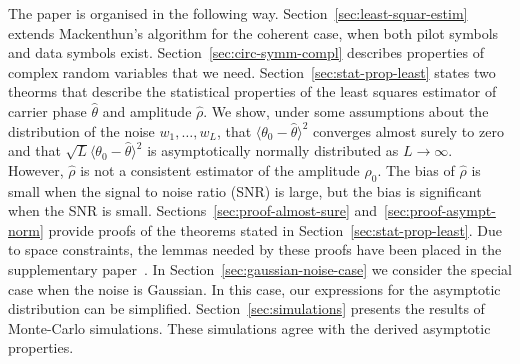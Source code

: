 \documentclass[journal]{IEEEtran}
\begin{document}
The paper is organised in the following way.  Section~\ref{sec:least-squar-estim} extends Mackenthun's algorithm for the coherent case, when both pilot symbols and data symbols exist.  Section~\ref{sec:circ-symm-compl} describes properties of complex random variables that we need.  Section~\ref{sec:stat-prop-least} states two theorms that describe the statistical properties of the least squares estimator of carrier phase $\hat{\theta}$ and amplitude $\hat{\rho}$.  We show, under some assumptions about the distribution of the noise $w_1,\dots,w_L$, that $\langle\theta_0 - \hat{\theta}\rangle^2$ converges almost surely to zero and that $\sqrt{L}\langle\theta_0 - \hat{\theta}\rangle^2$ is asymptotically normally distributed as $L\rightarrow \infty$.  However, $\hat{\rho}$ is not a consistent estimator of the amplitude $\rho_0$.  The bias of $\hat{\rho}$ is small when the signal to noise ratio (SNR) is large, but the bias is significant when the SNR is small.  Sections~\ref{sec:proof-almost-sure} and~\ref{sec:proof-asympt-norm} provide proofs of the theorems stated in Section~\ref{sec:stat-prop-least}.  Due to space constraints, the lemmas needed by these proofs have been placed in the supplementary paper~\cite{McKilliam_leastsqPSKpilotsdata_2012appendix}.  In Section~\ref{sec:gaussian-noise-case} we consider the special case when the noise is Gaussian.  In this case, our expressions for the asymptotic distribution can be simplified.  Section~\ref{sec:simulations} presents the results of Monte-Carlo simulations.  These simulations agree with the derived asymptotic properties. 

\end{document}
